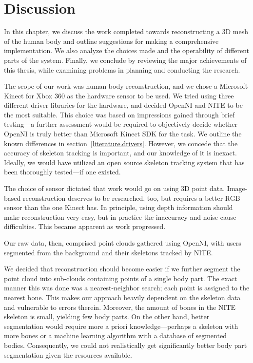 \chapter{Discussion}

In this chapter, we discuss the work completed towards reconstructing a 3D mesh of the human body and outline suggestions for making a comprehensive implementation. We also analyze the choices made and the operability of different parts of the system. Finally, we conclude by reviewing the major achievements of this thesis, while examining problems in planning and conducting the research.

 \label{fig:phases}

\newtopic

The scope of our work was human body reconstruction, and we chose a Microsoft Kinect for Xbox 360 as the hardware sensor to be used. We tried using three different driver libraries for the hardware, and decided OpenNI and NITE to be the most suitable. This choice was based on impressions gained through brief testing---a further assessment would be required to objectively decide whether OpenNI is truly better than Microsoft Kinect SDK for the task. We outline the known differences in section~\ref{literature.drivers}. However, we concede that the accuracy of skeleton tracking is important, and our knowledge of it is inexact. Ideally, we would have utilized an open source skeleton tracking system that has been thoroughly tested---if one existed.

The choice of sensor dictated that work would go on using 3D point data. Image-based reconstruction deserves to be researched, too, but requires a better RGB sensor than the one Kinect has. In principle, using depth information should make reconstruction very easy, but in practice the inaccuracy and noise cause difficulties. This became apparent as work progressed.

Our raw data, then, comprised point clouds gathered using OpenNI, with users segmented from the background and their skeletons tracked by NITE.

We decided that reconstruction should become easier if we further segment the point cloud into sub-clouds containing points of a single body part. The exact manner this was done was a nearest-neighbor search; each point is assigned to the nearest bone. This makes our approach heavily dependent on the skeleton data and vulnerable to errors therein. Moreover, the amount of bones in the NITE skeleton is small, yielding few body parts. On the other hand, better segmentation would require more a priori knowledge---perhaps a skeleton with more bones or a machine learning algorithm with a database of segmented bodies. Consequently, we could not realistically get significantly better body part segmentation given the resources available.

